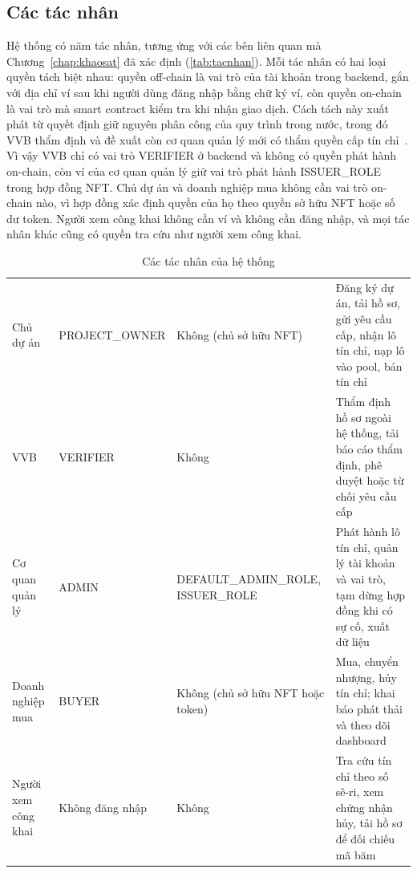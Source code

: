 \subsection*{Các tác nhân}
\label{subsec:tacnhan}

Hệ thống có năm tác nhân, tương ứng với các bên liên quan mà Chương~\ref{chap:khaosat} đã xác định (\autoref{tab:tacnhan}). Mỗi tác nhân có hai loại quyền tách biệt nhau: quyền off-chain là vai trò của tài khoản trong backend, gắn với địa chỉ ví sau khi người dùng đăng nhập bằng chữ ký ví, còn quyền on-chain là vai trò mà smart contract kiểm tra khi nhận giao dịch. Cách tách này xuất phát từ quyết định giữ nguyên phân công của quy trình trong nước, trong đó VVB thẩm định và đề xuất còn cơ quan quản lý mới có thẩm quyền cấp tín chỉ~\cite{mae2025qd2935,vietnam2026nghidinh396}. Vì vậy VVB chỉ có vai trò VERIFIER ở backend và không có quyền phát hành on-chain, còn ví của cơ quan quản lý giữ vai trò phát hành ISSUER\_ROLE trong hợp đồng NFT. Chủ dự án và doanh nghiệp mua không cần vai trò on-chain nào, vì hợp đồng xác định quyền của họ theo quyền sở hữu NFT hoặc số dư token. Người xem công khai không cần ví và không cần đăng nhập, và mọi tác nhân khác cũng có quyền tra cứu như người xem công khai.

\begin{table}[!htbp]
    \centering
    \caption{Các tác nhân của hệ thống}
    \label{tab:tacnhan}
    \small
    \begin{tabularx}{\textwidth}{|L{2.5cm}|L{2.3cm}|L{3.0cm}|Y|}
        \hline
         &  &  &  \\
        \hline
        Chủ dự án & PROJECT\_\allowbreak OWNER & Không (chủ sở hữu NFT) & Đăng ký dự án, tải hồ sơ, gửi yêu cầu cấp, nhận lô tín chỉ, nạp lô vào pool, bán tín chỉ \\
        \hline
        VVB & VERIFIER & Không & Thẩm định hồ sơ ngoài hệ thống, tải báo cáo thẩm định, phê duyệt hoặc từ chối yêu cầu cấp \\
        \hline
        Cơ quan quản lý & ADMIN & DEFAULT\_\allowbreak ADMIN\_\allowbreak ROLE, ISSUER\_\allowbreak ROLE & Phát hành lô tín chỉ, quản lý tài khoản và vai trò, tạm dừng hợp đồng khi có sự cố, xuất dữ liệu \\
        \hline
        Doanh nghiệp mua & BUYER & Không (chủ sở hữu NFT hoặc token) & Mua, chuyển nhượng, hủy tín chỉ; khai báo phát thải và theo dõi dashboard \\
        \hline
        Người xem công khai & Không đăng nhập & Không & Tra cứu tín chỉ theo số sê-ri, xem chứng nhận hủy, tải hồ sơ để đối chiếu mã băm \\
        \hline
    \end{tabularx}
\end{table}

